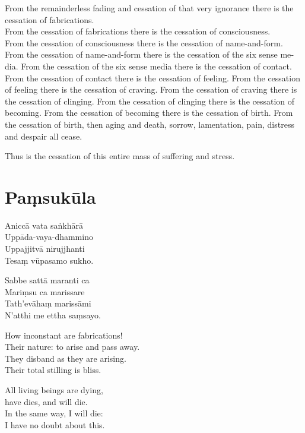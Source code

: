 \begin{english}
  From the remainderless fading and cessation of that very ignorance there is the
  cessation of fabrications.\\
From the cessation of fabrications there is the cessation of consciousness.\\
From the cessation of consciousness there is the cessation of name-and-form.
From the cessation of name-and-form there is the cessation of the six sense media.
From the cessation of the six sense media there is the cessation of contact.
From the cessation of contact there is the cessation of feeling.
From the cessation of feeling there is the cessation of craving.
From the cessation of craving there is the cessation of clinging.
From the cessation of clinging there is the cessation of becoming.
From the cessation of becoming there is the cessation of birth.
From the cessation of birth, then aging and death, sorrow, lamentation, pain,
  distress and despair all cease.

Thus is the cessation of this entire mass of suffering and stress.
\end{english}



\section{Paṃsukūla}




Aniccā vata saṅkhārā\\
Uppāda-vaya-dhammino\\
Uppajjitvā nirujjhanti\\
Tesaṃ vūpasamo sukho.

Sabbe sattā maranti ca\\
Mariṃsu ca marissare\\
Tath'evāhaṃ marissāmi\\
N'atthi me ettha saṃsayo.

\begin{english}
  How inconstant are fabrications!\\
  Their nature: to arise and pass away.\\
  They disband as they are arising.\\
  Their total stilling is bliss.

  All living beings are dying,\\
  have dies, and will die.\\
  In the same way, I will die:\\
  I have no doubt about this.
\end{english}

